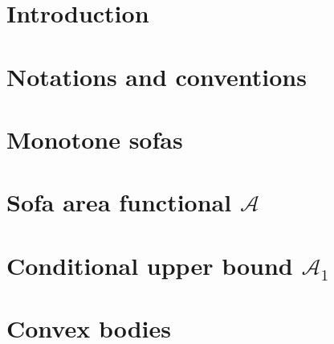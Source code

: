 \section{Introduction}
\label{sec:introduction}


\section{Notations and conventions}
\label{sec:notations-and-conventions}


\section{Monotone sofas}
\label{sec:monotone-sofas}


\section{Sofa area functional $\mathcal{A}$}
\label{sec:sofa-area-functional-a}


\section{Conditional upper bound $\mathcal{A}_1$}
\label{sec:conditional-upper-bound-a1}


\appendix
\section{Convex bodies}
\label{sec:convex-bodies}


